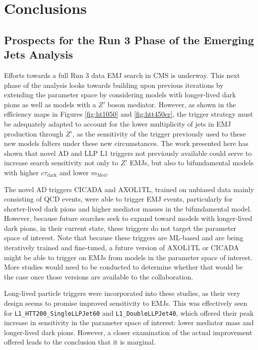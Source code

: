 \chapter{Conclusions}
\label{chap:conclusions}

\section{Prospects for the Run 3 Phase of the Emerging Jets Analysis}

Efforts towards a full Run 3 data EMJ search in CMS is underway. This next phase of the analysis looks towards building upon previous iterations by extending the parameter space by considering models with longer-lived dark pions as well as models with a $Z'$ boson mediator. However, as shown in the efficiency maps in Figures \ref{fig:ht1050} and \ref{fig:htt450er}, the trigger strategy must be adequately adapted to account for the lower multiplicity of jets in EMJ production through $Z'$, as the sensitivity of the trigger previously used to these new models falters under these new circumstances. The work presented here has shown that novel AD and LLP L1 triggers not previously available could serve to increase search sensitivity not only to $Z'$ EMJs, but also to bifundamental models with higher $c\tau_{\text{dark}}$ and lower $m_{\text{Med}}$.

The novel AD triggers CICADA and AXOL1TL, trained on unbiased data mainly consisting of QCD events, were able to trigger EMJ events, particularly for shorter-lived dark pions and higher mediator masses in the bifundamental model. However, because future searches seek to expand toward models with longer-lived dark pions, in their current state, these triggers do not target the parameter space of interest. Note that because these triggers are ML-based and are being iteratively trained and fine-tuned, a future version of AXOL1TL or CICADA might be able to trigger on EMJs from models in the parameter space of interest. More studies would need to be conducted to determine whether that would be the case once those versions are available to the collaboration.

Long-lived particle triggers were incorporated into these studies, as their very design seems to promise improved sensitivity to EMJs. This was effectively seen for \texttt{L1\_HTT200\_SingleLLPJet60} and \texttt{L1\_DoubleLLPJet40}, which offered their peak increase in sensitivity in the parameter space of interest: lower mediator mass and longer-lived dark pions. However, a closer examination of the actual improvement offered leads to the conclusion that it is marginal.

